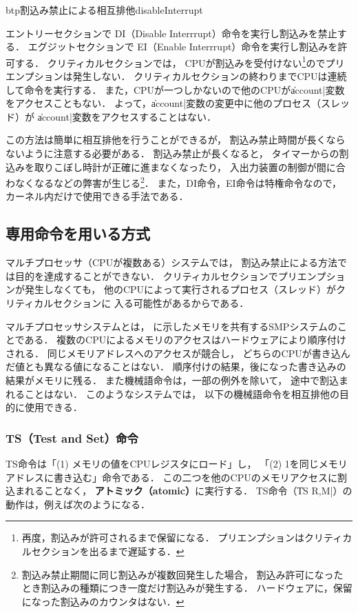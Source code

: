 \begin{myfig}{btp}{割込み禁止による相互排他}{disableInterrupt}

\end{myfig}

エントリーセクションで
DI（Disable Interrrupt）命令を実行し割込みを禁止する．
エグジットセクションで
EI（Enable Interrrupt）命令を実行し割込みを許可する．
クリティカルセクションでは，
CPUが割込みを受付けない\footnote{
再度，割込みが許可されるまで保留になる．
プリエンプションはクリティカルセクションを出るまで遅延する．
}のでプリエンプションは発生しない．
クリティカルセクションの終わりまでCPUは連続して命令を実行する．
また，CPUが一つしかないので他のCPUが\|account|変数をアクセスこともない．
よって，\|account|変数の変更中に他のプロセス（スレッド）が
\|account|変数をアクセスすることはない．

この方法は簡単に相互排他を行うことができるが，
割込み禁止時間が長くならないように注意する必要がある．
割込み禁止が長くなると，
タイマーからの割込みを取りこぼし時計が正確に進まなくなったり，
入出力装置の制御が間に合わなくなるなどの弊害が生じる\footnote{
割込み禁止期間に同じ割込みが複数回発生した場合，
割込み許可になったとき割込みの種類につき一度だけ割込みが発生する．
ハードウェアに，保留になった割込みのカウンタはない．}．
また，DI命令，EI命令は特権命令なので，
カーネル内だけで使用できる手法である．

\subsection{専用命令を用いる方式}
マルチプロセッサ（CPUが複数ある）システムでは，
割込み禁止による方法では目的を達成することができない．
クリティカルセクションでプリエンプションが発生しなくても，
他のCPUによって実行されるプロセス（スレッド）がクリティカルセクションに
入る可能性があるからである．

マルチプロセッサシステムとは，
に示したメモリを共有するSMPシステムのことである．
複数のCPUによるメモリのアクセスはハードウェアにより順序付けされる．
同じメモリアドレスへのアクセスが競合し，
どちらのCPUが書き込んだ値とも異なる値になることはない．
順序付けの結果，後になった書き込みの結果がメモリに残る．
また機械語命令は，一部の例外を除いて，
途中で割込まれることはない．
このようなシステムでは，
以下の機械語命令を相互排他の目的に使用できる．

\subsubsection{TS（Test and Set）命令}
TS命令は「(1) メモリの値をCPUレジスタにロード」し，
「(2) 1を同じメモリアドレスに書き込む」命令である．
この二つを他のCPUのメモリアクセスに割込まれることなく，
{\bf アトミック（atomic）}に実行する．
TS命令（\|TS R,M|）の動作は，例えば次のようになる．

